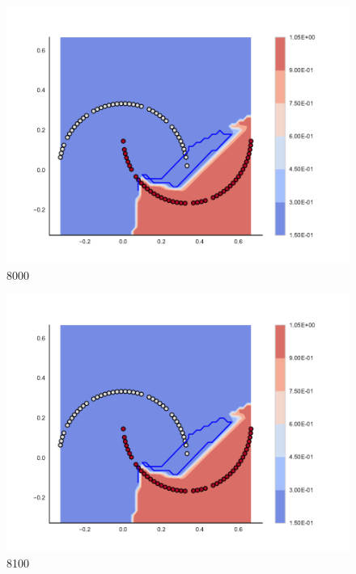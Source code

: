 \begin{subfigure}[b]{0.09\textwidth}
    \includegraphics[clip, trim=2.35cm 1.75cm 4.5cm 0cm,width=\textwidth]{img/convergence/8000.pdf}
    \caption{8000}
    \label{fig:convergence_8000}
\end{subfigure}
%
\begin{subfigure}[b]{0.09\textwidth}
    \includegraphics[clip, trim=2.35cm 1.75cm 4.5cm 0cm,width=\textwidth]{img/convergence/8100.pdf}
    \caption{8100}
    \label{fig:convergence_8100}
\end{subfigure}
%
